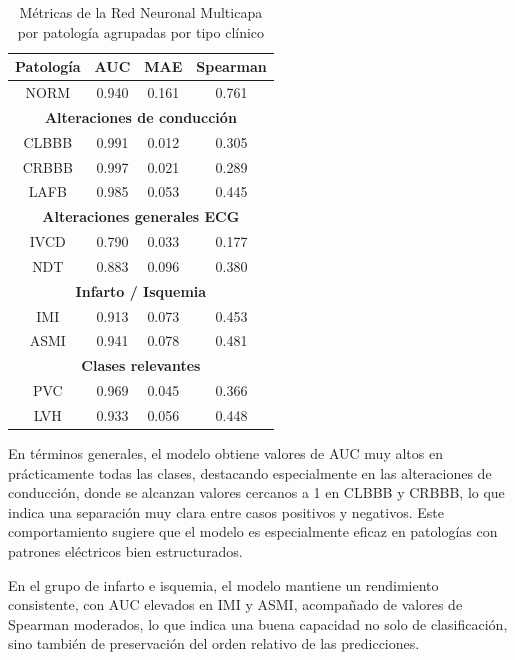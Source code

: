 \documentclass[12pt,a4paper,twoside]{book}
\begin{document}
\begin{table}[H]
	\centering
	\begin{tabular}{|c|c|c|c|}
	\hline

	\textbf{Patología} & \textbf{AUC} & \textbf{MAE} & \textbf{Spearman} \\
	\hline
	NORM & 0.940 & 0.161 & 0.761 \\
	\hline

	\multicolumn{4}{|c|}{\textbf{Alteraciones de conducción}} \\
	\hline
	CLBBB & 0.991 & 0.012 & 0.305 \\ 
	CRBBB & 0.997 & 0.021 & 0.289 \\ 
	LAFB  & 0.985 & 0.053 & 0.445 \\
	\hline

	\multicolumn{4}{|c|}{\textbf{Alteraciones generales ECG}} \\
	\hline
	IVCD & 0.790 & 0.033 & 0.177 \\ 
	NDT  & 0.883 & 0.096 & 0.380 \\
	\hline

	\multicolumn{4}{|c|}{\textbf{Infarto / Isquemia}} \\
	\hline
	IMI  & 0.913 & 0.073 & 0.453 \\ 
	ASMI & 0.941 & 0.078 & 0.481 \\
	\hline

	\multicolumn{4}{|c|}{\textbf{Clases relevantes}} \\
	\hline
	PVC & 0.969 & 0.045 & 0.366 \\ 
	LVH & 0.933 & 0.056 & 0.448 \\
	\hline

	\end{tabular}
	\caption{Métricas de la Red Neuronal Multicapa por patología agrupadas por tipo clínico}
	\label{tab:metrics_grouped_mlp}
\end{table}

En términos generales, el modelo obtiene valores de AUC muy altos en prácticamente todas las clases, destacando especialmente en las alteraciones de conducción, donde se alcanzan valores cercanos a 1 en CLBBB y CRBBB, lo que indica una separación muy clara entre casos positivos y negativos. 
Este comportamiento sugiere que el modelo es especialmente eficaz en patologías con patrones eléctricos bien estructurados.

En el grupo de infarto e isquemia, el modelo mantiene un rendimiento consistente, con AUC elevados en IMI y ASMI, acompañado de valores de Spearman moderados, lo que indica una buena capacidad no solo de clasificación, sino también de preservación del orden relativo de las predicciones.
\end{document}
